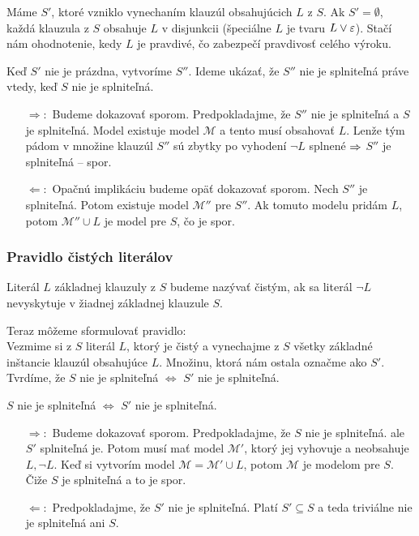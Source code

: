 \begin{dokaz}
    Máme $S'$, ktoré vzniklo vynechaním klauzúl obsahujúcich $L$ z $S$.
    Ak $S'=\emptyset$, každá klauzula z $S$ obsahuje $L$ v disjunkcii
    (špeciálne $L$ je tvaru $L \lor \varepsilon$).
    Stačí nám ohodnotenie, kedy $L$ je pravdivé, čo zabezpečí
    pravdivosť celého výroku. 

    Keď $S'$ nie je prázdna, vytvoríme $S''$.
    Ideme ukázať, že $S''$ nie je splniteľná práve vtedy,
    keď $S$ nie je splniteľná.

    \begin{itemize}
    \item[$\Rightarrow:$] Budeme dokazovať sporom.
        Predpokladajme, že $S''$ nie je splniteľná a $S$ je splniteľná.
        Model existuje model $\mathcal{M}$ a tento musí obsahovať $L$.
        Lenže tým pádom v množine klauzúl $S''$ sú zbytky po vyhodení
        $\neg L$ splnené $\Rightarrow$ $S''$ je splniteľná -- spor.

    \item[$\Leftarrow:$] Opačnú implikáciu budeme opäť dokazovať sporom.
        Nech $S''$ je splniteľná. Potom existuje model
        $\mathcal{M}''$ pre $S''$. Ak tomuto modelu pridám $L$, potom
        $\mathcal{M}'' \cup L$ je model pre $S$, čo je spor.
    \end{itemize}
\end{dokaz}
\subsubsection{Pravidlo čistých literálov}

\begin{definicia}
    Literál $L$ základnej klauzuly z $S$ budeme nazývať čistým,
    ak sa literál $\neg L$ nevyskytuje v žiadnej základnej klauzule $S$.
\end{definicia}

\noindent
Teraz môžeme sformulovať pravidlo: \\
Vezmime si z $S$ literál $L$, ktorý je čistý
a vynechajme z $S$ všetky základné inštancie klauzúl obsahujúce $L$.
Množinu, ktorá nám ostala označme ako $S'$.
Tvrdíme, že $S$ nie je splniteľná $\iff$ $S'$ nie je splniteľná.


\begin{dokaz}
    $S$ nie je splniteľná $\iff$ $S'$ nie je splniteľná.
    \begin{itemize}
    \item[$\Rightarrow:$] Budeme dokazovať sporom.
        Predpokladajme, že $S$ nie je splniteľná.
        ale $S'$ splniteľná je. Potom musí mať
        model $\mathcal{M}'$, ktorý jej vyhovuje a neobsahuje
        $L, \neg L$.  Keď si vytvorím model $\mathcal{M}=\mathcal{M}'\cup L$,
        potom $\mathcal{M}$ je modelom pre $S$. Čiže
        $S$ je splniteľná a to je spor.

    \item[$\Leftarrow:$] Predpokladajme, že
        $S'$ nie je splniteľná. Platí $S' \subseteq S$ a teda
        triviálne nie je splniteľná ani $S$.
    \end{itemize}
\end{dokaz}

